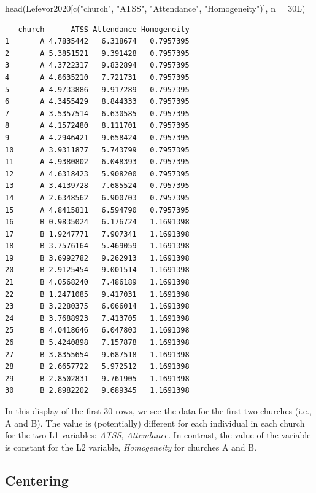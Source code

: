 \documentclass[
  english,
]{book}
\newenvironment{Shaded}{\begin{snugshade}}{\end{snugshade}}
\newcommand{\AttributeTok}[1]{\textcolor[rgb]{0.77,0.63,0.00}{#1}}
\newcommand{\FunctionTok}[1]{\textcolor[rgb]{0.00,0.00,0.00}{#1}}
\newcommand{\NormalTok}[1]{#1}
\newcommand{\StringTok}[1]{\textcolor[rgb]{0.31,0.60,0.02}{#1}}
\begin{document}
\begin{Shaded}
\begin{Highlighting}[]
\FunctionTok{head}\NormalTok{(Lefevor2020[}\FunctionTok{c}\NormalTok{(}\StringTok{"church"}\NormalTok{, }\StringTok{"ATSS"}\NormalTok{, }\StringTok{"Attendance"}\NormalTok{, }\StringTok{"Homogeneity"}\NormalTok{)], }\AttributeTok{n =}\NormalTok{ 30L)}
\end{Highlighting}
\end{Shaded}

\begin{verbatim}
   church      ATSS Attendance Homogeneity
1       A 4.7835442   6.318674   0.7957395
2       A 5.3851521   9.391428   0.7957395
3       A 4.3722317   9.832894   0.7957395
4       A 4.8635210   7.721731   0.7957395
5       A 4.9733886   9.917289   0.7957395
6       A 4.3455429   8.844333   0.7957395
7       A 3.5357514   6.630585   0.7957395
8       A 4.1572480   8.111701   0.7957395
9       A 4.2946421   9.658424   0.7957395
10      A 3.9311877   5.743799   0.7957395
11      A 4.9380802   6.048393   0.7957395
12      A 4.6318423   5.908200   0.7957395
13      A 3.4139728   7.685524   0.7957395
14      A 2.6348562   6.900703   0.7957395
15      A 4.8415811   6.594790   0.7957395
16      B 0.9835024   6.176724   1.1691398
17      B 1.9247771   7.907341   1.1691398
18      B 3.7576164   5.469059   1.1691398
19      B 3.6992782   9.262913   1.1691398
20      B 2.9125454   9.001514   1.1691398
21      B 4.0568240   7.486189   1.1691398
22      B 1.2471085   9.417031   1.1691398
23      B 3.2280375   6.066014   1.1691398
24      B 3.7688923   7.413705   1.1691398
25      B 4.0418646   6.047803   1.1691398
26      B 5.4240898   7.157878   1.1691398
27      B 3.8355654   9.687518   1.1691398
28      B 2.6657722   5.972512   1.1691398
29      B 2.8502831   9.761905   1.1691398
30      B 2.8982202   9.689345   1.1691398
\end{verbatim}

In this display of the first 30 rows, we see the data for the first two churches (i.e., A and B). The value is (potentially) different for each individual in each church for the two L1 variables: \emph{ATSS}, \emph{Attendance.} In contrast, the value of the variable is constant for the L2 variable, \emph{Homogeneity} for churches A and B.

\hypertarget{centering}{%
\subsection{Centering}\label{centering}}
\end{document}
